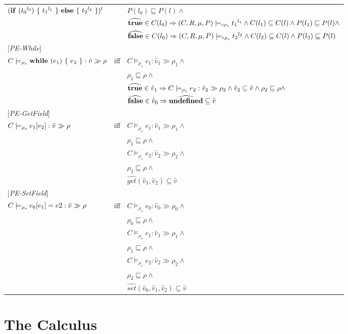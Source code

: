 \documentclass[[12pt,a4paper,twoside,openrigh]{article}
\newcommand{\vat}[0]{\hat{v}}
\newcommand{\modelrho}{\models_{\rho_s}}
\newcommand{\caesti}[2]{C \modelrho #1 : \vat_{#2} \gg \rho_{#2}}
\newcommand{\caest}[1]{C \modelrho #1 : \vat \gg \rho}
\newcommand{\envs}{(C,R,\mu, P)}
\newcommand{\ccest}[1]{\envs \models_{c \rho_s} #1}
\newcommand{\lbt}[1]{{t_#1}^{l_#1}}
\begin{document}
\begin{tabular}{l l l}
$(\cond {\lbt 0} {\lbt 1} {\lbt 2})^l$&& $P(l_0) \sqsubseteq P(l) \wedge$ \\
&& $\widehat{\true} \in C(l_0) \Rightarrow \ccest {\lbt 1} \wedge C(l_1) \subseteq C(l) \wedge P(l_1) \sqsubseteq P(l) \wedge$ \\
&& $\widehat{\false} \in C(l_0) \Rightarrow \ccest {\lbt 2} \wedge C(l_2) \subseteq C(l) \wedge P(l_2) \sqsubseteq P(l)$ \\
{[\textit{PE-While}]}\\
$\caest {\while {e_1} {e_2}} $& iff &$ \caesti {e_1} {1} \wedge $\\
&& $\rho_1 \sqsubseteq \rho \wedge$ \\
&& $\widehat{\true} \in \vat_1 \Rightarrow \caesti {e_2} {2} \wedge \vat_2 \subseteq \vat \wedge \rho_2 \sqsubseteq \rho \wedge$\\
&& $\widehat{\false} \in \vat_0 \Rightarrow \widehat{\undef} \subseteq \vat$\\
{[\textit{PE-GetField}]}\\
$\caest {\lookup {e_1} {e_2}} $& iff &$ \caesti {e_1} {1} \wedge $\\
&& $\rho_1 \sqsubseteq \rho \wedge$ \\
&& $ \caesti {e_2} {2} \wedge $ \\
&& $\rho_2 \sqsubseteq \rho \wedge$ \\
&& $\widehat{get} (\vat_1, \vat_2) \subseteq \vat$ \\
{[\textit{PE-SetField}]}\\
$\caest {\store {e_0} {e_1} {e2}} $& iff &$ \caesti {e_0} {0} \wedge $\\
&& $\rho_0 \sqsubseteq \rho \wedge$ \\
&& $ \caesti {e_1} {1} \wedge $ \\
&& $\rho_1 \sqsubseteq \rho \wedge$ \\
&& $ \caesti {e_2} {2} \wedge $ \\
&& $\rho_2 \sqsubseteq \rho \wedge$ \\
&& $\widehat{set} (\vat_0, \vat_1, \vat_2) \subseteq \vat$ \\
\end{tabular}

% 
\section{The Calculus}
\label{sec:calculus}
\end{document}
